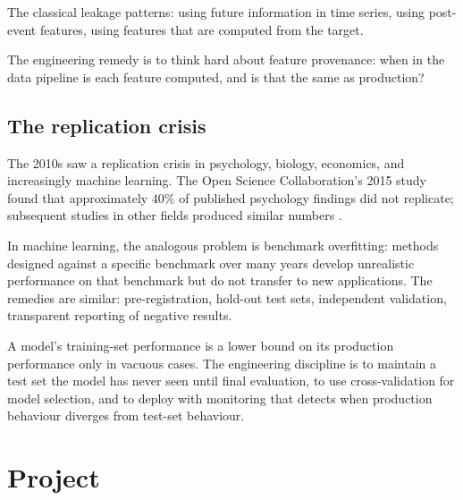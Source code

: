 The classical leakage patterns: using future information in time series, using post-event features, using features that are computed from the target.

The engineering remedy is to think hard about feature provenance: when in the data pipeline is each feature computed, and is that the same as production?

\subsection{The replication crisis}

The 2010s saw a replication crisis in psychology, biology, economics, and increasingly machine learning. The Open Science Collaboration's 2015 study found that approximately $40\%$ of published psychology findings did not replicate; subsequent studies in other fields produced similar numbers \cite{method:open-science-collaboration-2015}.

In machine learning, the analogous problem is benchmark overfitting: methods designed against a specific benchmark over many years develop unrealistic performance on that benchmark but do not transfer to new applications. The remedies are similar: pre-registration, hold-out test sets, independent validation, transparent reporting of negative results.

\begin{principle}
A model's training-set performance is a lower bound on its production performance only in vacuous cases. The engineering discipline is to maintain a test set the model has never seen until final evaluation, to use cross-validation for model selection, and to deploy with monitoring that detects when production behaviour diverges from test-set behaviour.
\end{principle}

\section{Project}

